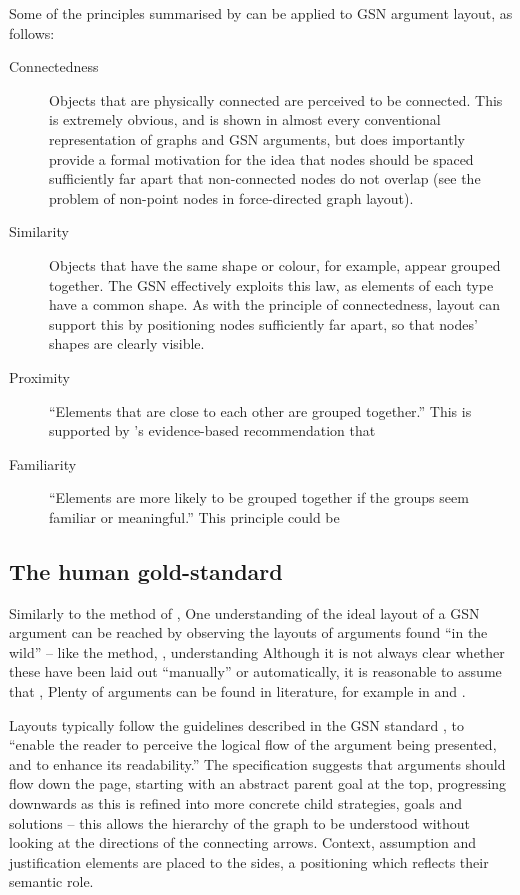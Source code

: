 Some of the principles summarised by \citet{kennysun} can be applied to GSN argument layout, as follows:

\begin{description}
    \item[Connectedness] Objects that are physically connected are perceived to be connected. This is extremely obvious, and is shown in almost every conventional representation of graphs and GSN arguments, but does importantly provide a formal motivation for the idea that nodes should be spaced sufficiently far apart that non-connected nodes do not overlap (see the problem of non-point nodes in force-directed graph layout). 

    \item[Similarity] Objects that have the same shape or colour, for example, appear grouped together.
    The GSN effectively exploits this law, as elements of each type have a common shape. As with the principle of connectedness, layout can support this by positioning nodes sufficiently far apart, so that nodes' shapes are clearly visible.
    
    \item[Proximity] ``Elements that are close to each other are grouped together.'' This is supported by \citet{huang2007effects}'s evidence-based recommendation that 
    
    \item[Familiarity] ``Elements are more likely to be grouped together if the groups seem familiar or meaningful.'' This principle could be 
    
\end{description}



\subsection{The human gold-standard \label{sec:humangold}}

Similarly to the method of \citet{5674033}, One understanding of the ideal layout of a GSN argument can be reached by observing the layouts of arguments found ``in the wild'' -- like the method, , understanding 
Although it is not always clear whether these have been laid out ``manually'' or automatically, it is reasonable to assume that , 
Plenty of arguments can be found in literature, for example in \cite{Habli:2006:PPC:1183088.1183090} and  \cite{insilico}.

Layouts typically follow the guidelines described in the GSN standard \citep[section~2.2, pp.~26--27]{gsnstandard},
to ``enable the reader to perceive the logical flow of the argument being presented, and to enhance its readability.''
The specification suggests that arguments should flow down the page, starting with an abstract parent goal at the top, progressing downwards as this is refined into more concrete child strategies, goals and solutions -- this allows the hierarchy of the graph to be understood without looking at the directions of the connecting arrows.
Context, assumption and justification elements are placed to the sides, a positioning which reflects their semantic role.

